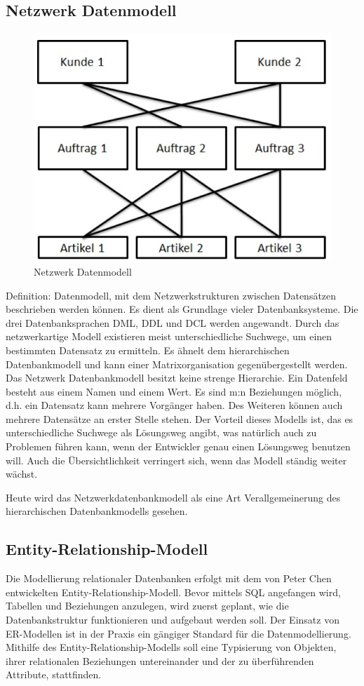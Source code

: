  \subsection{Netzwerk Datenmodell}

 \begin{figure}
    \begin{center}
        \includegraphics[width=.35\textwidth]{Content/images/modellierung/netzwerk.png}
    \end{center}
    \caption{Netzwerk Datenmodell}
    \label{fig:modellierung:netzwerk}
\end{figure}
Definition: Datenmodell, mit dem Netzwerkstrukturen zwischen Datensätzen beschrieben werden können.
Es dient als Grundlage vieler Datenbanksysteme. Die drei Datenbanksprachen DML, DDL und DCL werden angewandt. Durch das netzwerkartige Modell existieren meist unterschiedliche Suchwege, um einen bestimmten Datensatz zu ermitteln. Es ähnelt dem hierarchischen Datenbankmodell und kann einer Matrixorganisation gegenübergestellt werden. 
Das Netzwerk Datenbankmodell besitzt keine strenge Hierarchie. Ein Datenfeld besteht aus einem Namen und einem Wert.
Es sind m:n Beziehungen möglich, d.h. ein Datensatz kann mehrere Vorgänger haben. Des Weiteren können auch mehrere Datensätze an erster Stelle stehen. Der Vorteil dieses Modells ist, das es unterschiedliche Suchwege als Lösungsweg angibt, was natürlich auch zu Problemen führen kann, wenn der Entwickler genau einen Lösungsweg benutzen will. Auch die Übersichtlichkeit verringert sich, wenn das Modell ständig weiter wächst.

 Heute wird das Netzwerkdatenbankmodell als eine Art Verallgemeinerung des hierarchischen Datenbankmodells gesehen.

 \subsection{Entity-Relationship-Modell}

Die Modellierung relationaler Datenbanken erfolgt mit dem von Peter Chen entwickelten Entity-Relationship-Modell. Bevor mittels SQL angefangen wird, Tabellen und Beziehungen anzulegen, wird zuerst geplant, wie die Datenbankstruktur funktionieren und aufgebaut werden soll. Der Einsatz von ER-Modellen ist in der Praxis ein gängiger Standard für die Datenmodellierung.
Mithilfe des Entity-Relationship-Modells soll eine Typisierung von Objekten, ihrer relationalen Beziehungen untereinander und der zu überführenden Attribute, stattfinden.

